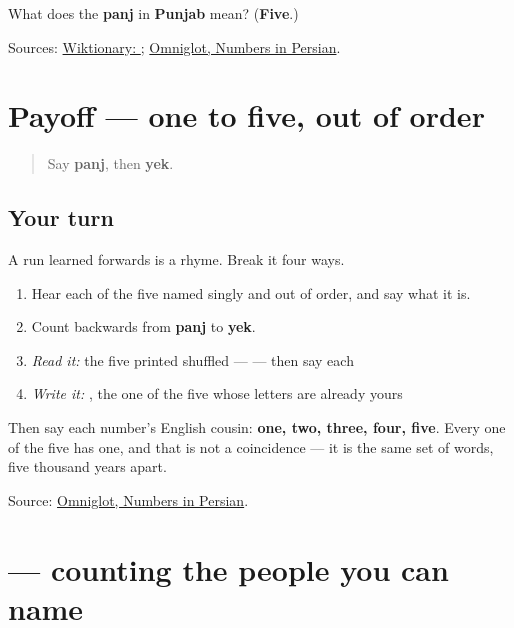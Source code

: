 \begin{tcolorbox}[breakable,colback=teal!4,colframe=teal!35!black,title={Before you move on}]
What does the \textbf{panj} in \textbf{Punjab} mean? (\textbf{Five}.)

Sources: \href{https://en.wiktionary.org/wiki/\%D9\%BE\%D9\%86\%D8\%AC}{Wiktionary: }; \href{https://www.omniglot.com/language/numbers/persian.htm}{Omniglot, Numbers in Persian}.
\end{tcolorbox}
\section[Practice]{Payoff — one to five, out of order}

\label{lesson:FA-C16-practice}



\begin{quote}
Say \textbf{panj}, then \textbf{yek}.
\end{quote}

\subsection*{Your turn}
A run learned forwards is a rhyme. Break it four ways.

\begin{enumerate}
\raggedright
  \item Hear each of the five named singly and out of order, and say what it is.
  \item Count backwards from \textbf{panj} to \textbf{yek}.
  \item \emph{Read it:} the five printed shuffled — \textbf{    } — then say each
  \item \emph{Write it:} \textbf{}, the one of the five whose letters are already yours
\end{enumerate}

Then say each number's English cousin: \textbf{one, two, three, four, five}. Every one of the five has one, and that is not a coincidence — it is the same set of words, five thousand years apart.

\begin{tcolorbox}[breakable,colback=teal!4,colframe=teal!35!black,title={Before you move on}]
Source: \href{https://www.omniglot.com/language/numbers/persian.htm}{Omniglot, Numbers in Persian}.
\end{tcolorbox}
\section[\texorpdfstring{\fa{یک} \fa{دوست} (yek dust)}{یک دوست (yek dust)}]{  — counting the people you can name}

